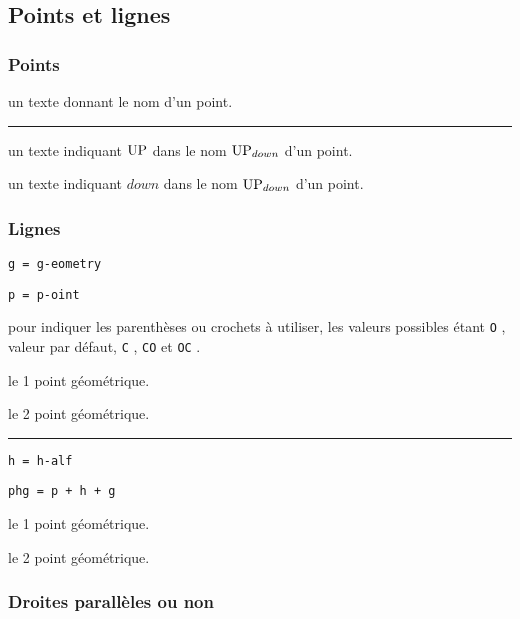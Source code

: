 \documentclass[12pt,a4paper]{article}
\theoremstyle{definition}
\newcommand\separation{
    \medskip
    \hfill\rule{0.5\textwidth}{0.75pt}\hfill
    \medskip
}
\newcommand\extraspace{
    \vspace{0.25em}
}
\newcommand\mwhyprefix[2]{%
    \texttt{#1 = #1-#2}%
}
\newcommand\prefix[1]{%
    \texttt{#1}%
}
\begin{document}
\subsection{Points et lignes}

\subsubsection{Points}




\IDarg{} un texte donnant le nom d'un point.


\separation



 un texte indiquant $\pt{UP}$ dans le nom $\pt*{UP}{down}$ d'un point.

 un texte indiquant $down$ dans le nom $\pt*{UP}{down}$ d'un point.




\subsubsection{Lignes}



  \hfill \mwhyprefix{g}{eometry}

  \hfill \mwhyprefix{p}{oint}

\IDoption{} pour indiquer les parenthèses ou crochets à utiliser, les valeurs possibles étant \prefix{O}, valeur par défaut, \prefix{C}, \prefix{CO} et \prefix{OC}.

 le 1\ier{} point géométrique.

 le 2\ieme{} point géométrique.


\separation


  \hfill \mwhyprefix{h}{alf}

  \hfill \prefix{phg = p + h + g}

\extraspace



 le 1\ier{} point géométrique.

 le 2\ieme{} point géométrique.




\subsubsection{Droites parallèles ou non}
\end{document}
